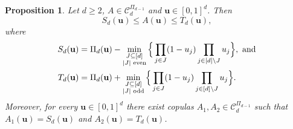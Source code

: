 \documentclass[12pt,a4paper]{amsart}
\newtheorem{proposition}[theorem]{Proposition}
\theoremstyle{definition}
\newcommand{\kc}{\mathcal{C}}
\begin{document}
\begin{proposition}\label{prop:dinf}
    Let $d \ge 2$, $A \in \kc_d^{\Pi_{d-1}}$ and $\mathbf{u} \in [0,1]^d$. Then
    $$ S_d(\mathbf{u}) \le A(\mathbf{u}) \le T_d(\mathbf{u}) ,$$
    where
    \begin{align*}
        S_d(\mathbf{u}) &= \Pi_d(\mathbf{u})-\min_{\substack{J \subseteq [d]\\ |J| \textup{ even}}} \Big\{\prod_{j \in J} (1-u_j) \prod_{j \in [d] \setminus J} u_j\Big\}, \text{ and}\\
        T_d(\mathbf{u}) &= \Pi_d(\mathbf{u})+\min_{\substack{J \subseteq [d]\\ |J| \textup{ odd}}} \Big\{\prod_{j \in J} (1-u_j) \prod_{j \in [d] \setminus J} u_j\Big\}.
    \end{align*}
    Moreover, for every $\mathbf{u} \in [0,1]^d$ there exist copulas $A_1,A_2 \in \kc_d^{\Pi_{d-1}}$ such that $A_1(\mathbf{u}) = S_d(\mathbf{u})$  and $A_2(\mathbf{u}) = T_d(\mathbf{u})$.
\end{proposition}
\end{document}
